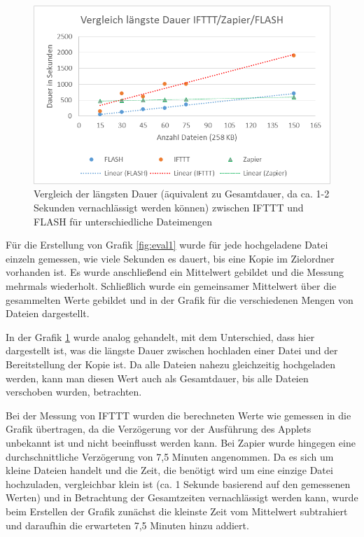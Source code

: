 \begin{figure}
	\centering
	\includegraphics[width=\textwidth]{bilder/vs_laengste2}
	\caption{Vergleich der längsten Dauer (äquivalent zu Gesamtdauer, da ca. 1-2 Sekunden vernachlässigt werden können) zwischen IFTTT und FLASH für unterschiedliche Dateimengen}
	\label{fig:eval2}
\end{figure}

Für die Erstellung von Grafik \ref{fig:eval1} wurde für jede hochgeladene Datei einzeln gemessen, wie viele Sekunden es dauert, bis eine Kopie im Zielordner vorhanden ist. Es wurde anschließend ein Mittelwert gebildet und die Messung mehrmals wiederholt. Schließlich wurde ein gemeinsamer Mittelwert über die gesammelten Werte gebildet und in der Grafik für die verschiedenen Mengen von Dateien dargestellt.

In der Grafik \ref{fig:eval2} wurde analog gehandelt, mit dem Unterschied, dass hier dargestellt ist, was die längste Dauer zwischen hochladen einer Datei und der Bereitstellung der Kopie ist. Da alle Dateien nahezu gleichzeitig hochgeladen werden, kann man diesen Wert auch als Gesamtdauer, bis alle Dateien verschoben wurden, betrachten.

Bei der Messung von IFTTT wurden die berechneten Werte wie gemessen in die Grafik übertragen, da die Verzögerung vor der Ausführung des Applets unbekannt ist und nicht beeinflusst werden kann. Bei Zapier wurde hingegen eine durchschnittliche Verzögerung von 7,5 Minuten angenommen. Da es sich um kleine Dateien handelt und die Zeit, die benötigt wird um eine einzige Datei hochzuladen, vergleichbar klein ist (ca. 1 Sekunde basierend auf den gemessenen Werten) und in Betrachtung der Gesamtzeiten vernachlässigt werden kann, wurde beim Erstellen der Grafik zunächst die kleinste Zeit vom Mittelwert subtrahiert und daraufhin die erwarteten 7,5 Minuten hinzu addiert.

